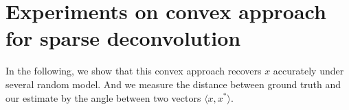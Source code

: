 \documentclass[letter, 10pt]{article}
\numberwithin{equation}{section}
\begin{document}
 



 
 


 


  


\section{Experiments on convex approach for sparse deconvolution}
In the following, we show that this convex approach recovers $x$ accurately under several random model.
And we measure the distance between ground truth and our estimate by the angle between two vectors $\langle x, x^* \rangle$.
\end{document}
